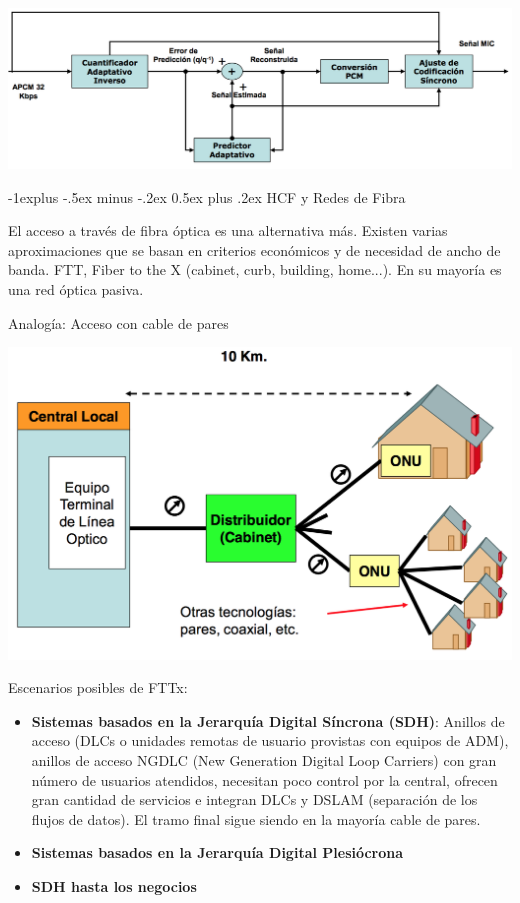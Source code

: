 \documentclass[10pt,portrait, twocolumn]{article}
\makeatletter
\renewcommand{\subsection}{\@startsection{subsection}{2}{0mm}%
                                {-1explus -.5ex minus -.2ex}%
                                {0.5ex plus .2ex}%
                                {\normalfont\normalsize\bfseries}}
\makeatother
\begin{document}
	\begin{center}
		\includegraphics[scale=0.2]{images/ADPCM2}
	\end{center}
	
\hrulefill

\subsection{HCF y Redes de Fibra}

El acceso a través de fibra óptica es una alternativa más. Existen varias aproximaciones que se basan en criterios económicos y de necesidad de ancho de banda. FTT, Fiber to the X (cabinet, curb, building, home...). En su mayoría es una red óptica pasiva. 

Analogía: Acceso con cable de pares
	
	\begin{center}
		\includegraphics[scale=0.2]{images/Analogia}
	\end{center}

Escenarios posibles de FTTx:

	\begin{itemize}
		\item \textbf{Sistemas basados en la Jerarquía Digital Síncrona (SDH)}: Anillos de acceso (DLCs o unidades remotas de usuario provistas con equipos de ADM), anillos de acceso NGDLC (New Generation Digital Loop Carriers) con gran número de usuarios atendidos, necesitan poco control por la central, ofrecen gran cantidad de servicios e integran DLCs y DSLAM (separación de los flujos de datos). El tramo final sigue siendo en la mayoría cable de pares.
		\item \textbf{Sistemas basados en la Jerarquía Digital Plesiócrona}
		\item \textbf{SDH hasta los negocios}
	\end{itemize}
\end{document}
